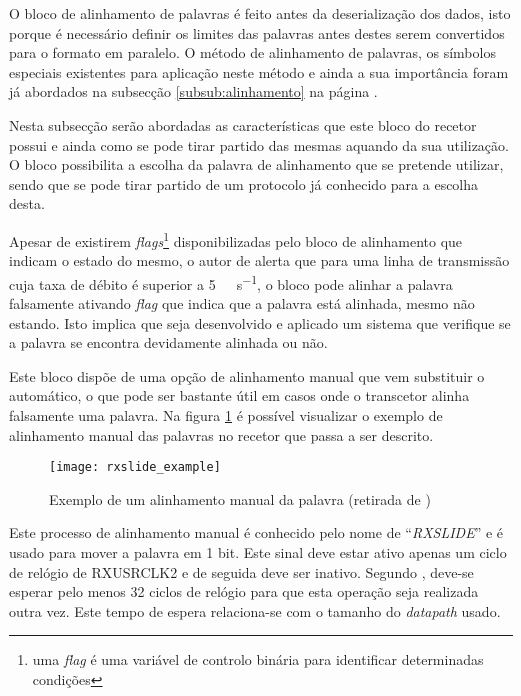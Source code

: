 O bloco de alinhamento de palavras é feito antes da deserialização dos dados, isto porque é necessário definir os limites das palavras antes destes serem convertidos para o formato em paralelo. O método de alinhamento de palavras, os símbolos especiais existentes para aplicação neste método e ainda a sua importância foram já abordados na subsecção \ref{subsub:alinhamento} na página \pageref{subsub:alinhamento}.

Nesta subsecção serão abordadas as características que este bloco do recetor possui e ainda como se pode tirar partido das mesmas aquando da sua utilização. O bloco possibilita a escolha da palavra de alinhamento que se pretende utilizar, sendo que se pode tirar partido de um protocolo já conhecido para a escolha desta.

Apesar de existirem \textit{flags}\footnote{uma \textit{flag} é uma variável de controlo binária para identificar determinadas condições} disponibilizadas pelo bloco de alinhamento que indicam o estado do mesmo, o autor de \cite{R011} alerta que para uma linha de transmissão cuja taxa de débito é superior a \SI{5}{\giga\bit\per\second}, o bloco pode alinhar a palavra falsamente ativando \textit{flag} que indica que a palavra está alinhada, mesmo não estando. Isto implica que seja desenvolvido e aplicado um sistema que verifique se a palavra se encontra devidamente alinhada ou não.


Este bloco dispõe de uma opção de alinhamento manual que vem substituir o automático, o que pode ser bastante útil em casos onde o transcetor alinha falsamente uma palavra. Na figura \ref{fig:rxslide_example} é possível visualizar o exemplo de alinhamento manual das palavras no recetor que passa a ser descrito.

\begin{figure}[h!]
	\begin{center}
		\leavevmode
		\texttt{[image: rxslide\_example]}
		\captionsetup{width=1.0\linewidth}
		\caption[Exemplo de um alinhamento manual da palavra]{Exemplo de um alinhamento manual da palavra (retirada de \cite{R011})}
		\label{fig:rxslide_example}
	\end{center}
\end{figure}

Este processo de alinhamento manual é conhecido pelo nome de ``\textit{RXSLIDE}'' e é usado para mover a palavra em 1 bit. Este sinal deve estar ativo apenas um ciclo de relógio de RXUSRCLK2 e de seguida deve ser inativo. Segundo \cite{R011}, deve-se esperar pelo menos 32 ciclos de relógio para que esta operação seja realizada outra vez. Este tempo de espera relaciona-se com o tamanho do \textit{datapath} usado.

